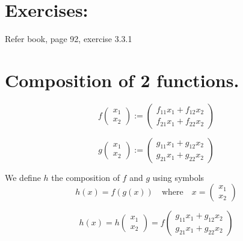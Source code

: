 \section{Exercises:}
Refer book, page 92, exercise 3.3.1

\section{Composition of 2 functions.}
\[
f\begin{pmatrix}
x_1 \\
x_2
\end{pmatrix}
:=
\begin{pmatrix}
f_{11}x_1 + f_{12}x_2 \\
f_{21}x_1 + f_{22}x_2
\end{pmatrix}
\]

\[
g\begin{pmatrix}
x_1 \\
x_2
\end{pmatrix}
:=
\begin{pmatrix}
g_{11}x_1 + g_{12}x_2 \\
g_{21}x_1 + g_{22}x_2
\end{pmatrix}
\]

We define $h$ the composition of $f$ and $g$ using symbols
\[
h(x) = f(g(x)) \quad \text{where} \quad x = \begin{pmatrix}
x_1 \\
x_2
\end{pmatrix}
\]

\[
h(x) = h\begin{pmatrix}
x_1 \\
x_2
\end{pmatrix}
=
f\begin{pmatrix}
g_{11}x_1 + g_{12}x_2 \\
g_{21}x_1 + g_{22}x_2
\end{pmatrix}
\]

